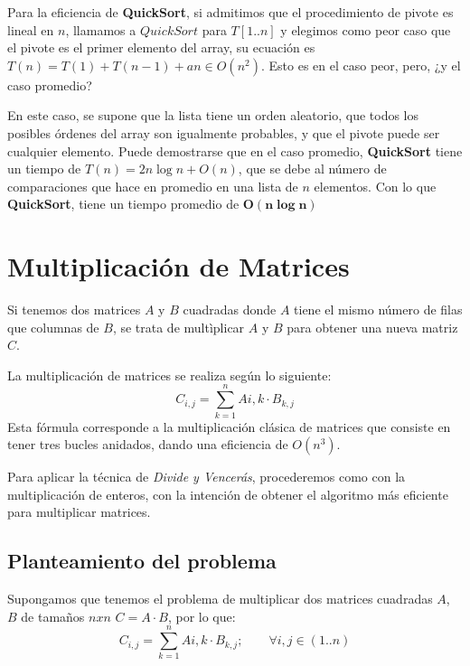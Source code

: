 \documentclass[10pt,a4paper,spanish]{report}
\theoremstyle{definition}
\theoremstyle{remark}
\begin{document}
Para la eficiencia de \textbf{\textcolor[rgb]{0.2,0.5,0.5}{QuickSort}}, si admitimos que el procedimiento de pivote es lineal en $n$, llamamos a $QuickSort$ para $T[1..n]$ y elegimos como peor caso que el pivote es el primer elemento del array, su ecuación es $T(n) = T(1) + T(n-1) + an \in O(n^2)$. Esto es en el caso peor, pero, ¿y el caso promedio?

En este caso, se supone que la lista tiene un orden aleatorio, que todos los posibles órdenes del array son igualmente probables, y que el pivote puede ser cualquier elemento. Puede demostrarse que en el caso promedio, \textbf{\textcolor[rgb]{0.2,0.5,0.5}{QuickSort}} tiene un tiempo de $T(n) = 2n\log n + O(n)$, que se debe al número de comparaciones que hace en promedio en una lista de $n$ elementos. Con lo que \textbf{\textcolor[rgb]{0.2,0.5,0.5}{QuickSort}}, tiene un tiempo promedio de \textbf{\textcolor[rgb]{0.2,0.5,0.5}{$\mathbf{O(n\log n)}$}}

\section{\textcolor[rgb]{0.2,0.5,0.5}Multiplicación de Matrices}

Si tenemos dos matrices $A$ y $B$ cuadradas donde $A$ tiene el mismo número de filas que columnas de $B$, se trata de multìplicar $A$ y $B$ para obtener una nueva matriz $C$.

La multiplicación de matrices se realiza según lo siguiente:
\begin{displaymath}
    C_{i,j} = \sum_{k=1}^nA{i,k} \cdot B_{k,j}
\end{displaymath}
Esta fórmula corresponde a la multiplicación clásica de matrices que consiste en tener tres bucles anidados, dando una eficiencia de $O(n^3)$.

Para aplicar la técnica de \textit{\textcolor[rgb]{0.2,0.5,0.5}{Divide y Vencerás}}, procederemos como con la multiplicación de enteros, con la intención de obtener el algoritmo más eficiente para multiplicar matrices.

\subsection{\textcolor[rgb]{0.2,0.5,0.5}Planteamiento del problema}

Supongamos que tenemos el problema de multiplicar dos matrices cuadradas $A$, $B$ de tamaños $nxn$ $C=A\cdot B$, por lo que:
\begin{displaymath}
    C_{i,j} = \sum_{k=1}^nA{i,k} \cdot B_{k,j};\qquad \forall i,j \in (1..n)
\end{displaymath}
\end{document}

